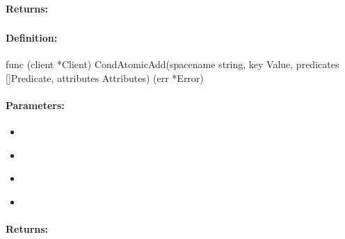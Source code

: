 \paragraph{Returns:}


\pagebreak
\subsubsection{}
\label{api:Go:CondAtomicAdd}


\paragraph{Definition:}
\begin{gocode}
func (client *Client) CondAtomicAdd(spacename string, key Value, predicates []Predicate, attributes Attributes) (err *Error)
\end{gocode}

\paragraph{Parameters:}
\begin{itemize}[noitemsep]
\item {}\\

\item {}\\

\item {}\\

\item {}\\

\end{itemize}

\paragraph{Returns:}


\pagebreak
\subsubsection{}
\label{api:Go:GroupAtomicAdd}


